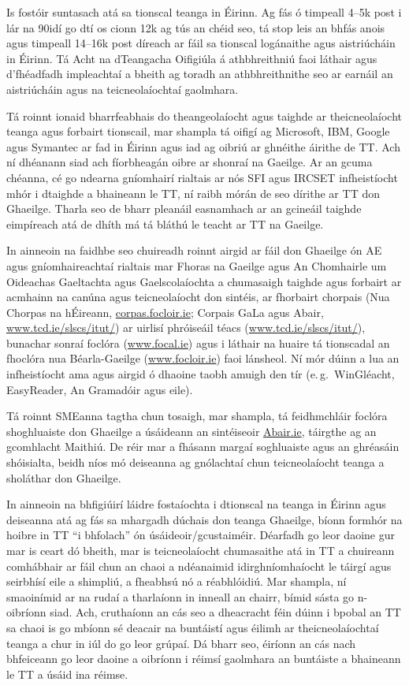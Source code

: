 \begin{multicols}{2}
Is fostóir suntasach atá sa tionscal teanga in Éirinn. Ag fás ó timpeall 4--5k post i lár na 90idí go dtí os cionn 12k ag tús an chéid seo, tá stop leis an bhfás anois agus timpeall 14--16k post díreach ar fáil sa tionscal logánaithe agus aistriúcháin in Éirinn. Tá Acht na dTeangacha Oifigiúla á athbhreithniú faoi láthair agus d'fhéadfadh impleachtaí a bheith ag toradh an athbhreithnithe seo ar earnáil an aistriúcháin agus na teicneolaíochtaí gaolmhara.

Tá roinnt ionaid bharrfeabhais do theangeolaíocht agus taighde ar theicneolaíocht teanga agus forbairt tionscail, mar shampla tá oifigí ag Microsoft, IBM, Google agus Symantec ar fad in Éirinn agus iad ag oibriú ar ghnéithe áirithe de TT. Ach ní dhéanann siad ach fíorbheagán oibre ar shonraí na Gaeilge. Ar an gcuma chéanna, cé go ndearna gníomhairí rialtais ar nós SFI agus IRCSET infheistíocht mhór i dtaighde a bhaineann le TT, ní raibh mórán de seo dírithe ar TT don Ghaeilge. Tharla seo de bharr pleanáil easnamhach ar an gcineáil taighde eimpíreach atá de dhíth má tá bláthú le teacht ar TT na Gaeilge.

In ainneoin na faidhbe seo chuireadh roinnt airgid ar fáil don Ghaeilge ón AE agus gníomhaireachtaí rialtais mar Fhoras na Gaeilge agus An Chomhairle um Oideachas Gaeltachta agus Gaelscolaíochta a chumasaigh taighde agus forbairt ar acmhainn na canúna agus teicneolaíocht don sintéis,  ar fhorbairt chorpais (Nua Chorpas na hÉireann, \url{corpas.focloir.ie}; Corpais GaLa agus Abair, \url{www.tcd.ie/slscs/itut/}) ar uirlisí phróiseáil téacs (\url{www.tcd.ie/slscs/itut/}), bunachar sonraí foclóra (\url{www.focal.ie}) agus i láthair na huaire tá tionscadal an fhoclóra nua Béarla-Gaeilge (\url{www.focloir.ie})  faoi lánsheol. Ní mór dúinn a lua an infheistíocht ama agus airgid ó dhaoine  taobh amuigh den tír (e.\,g.~WinGléacht, EasyReader, An Gramadóir agus eile).

Tá roinnt SMEanna tagtha chun tosaigh, mar shampla, tá feidhmchláir foclóra shoghluaiste don Ghaeilge a úsáideann an sintéiseoir \url{Abair.ie}, táirgthe ag an gcomhlacht Maithiú. De réir mar a fhásann margaí soghluaiste agus an ghréasáin shóisialta, beidh níos mó deiseanna ag gnólachtaí chun teicneolaíocht teanga a sholáthar don Ghaeilge.

In ainneoin na bhfigiúirí láidre fostaíochta i dtionscal na teanga in Éirinn agus deiseanna atá ag fás sa mhargadh dúchais don teanga Ghaeilge, bíonn formhór na hoibre in TT ``i bhfolach'' ón úsáideoir/gcustaiméir. Déarfadh go leor daoine gur mar is ceart dó bheith, mar is teicneolaíocht chumasaithe atá in TT a chuireann comhábhair ar fáil chun an chaoi a ndéanaimid idirghníomhaíocht le táirgí agus seirbhísí eile a shimpliú, a fheabhsú nó a réabhlóidiú. Mar shampla, ní smaoinímid ar na rudaí a tharlaíonn in inneall an chairr, bímid sásta go n-oibríonn siad. Ach, cruthaíonn an cás seo a dheacracht féin dúinn i bpobal an TT sa chaoi is go mbíonn sé deacair na buntáistí agus éilimh ar theicneolaíochtaí teanga a chur in iúl do go leor grúpaí. Dá bharr seo, éiríonn an cás nach bhfeiceann go leor daoine a oibríonn i réimsí gaolmhara an buntáiste a bhaineann le TT a úsáid ina réimse. 


\end{multicols}
